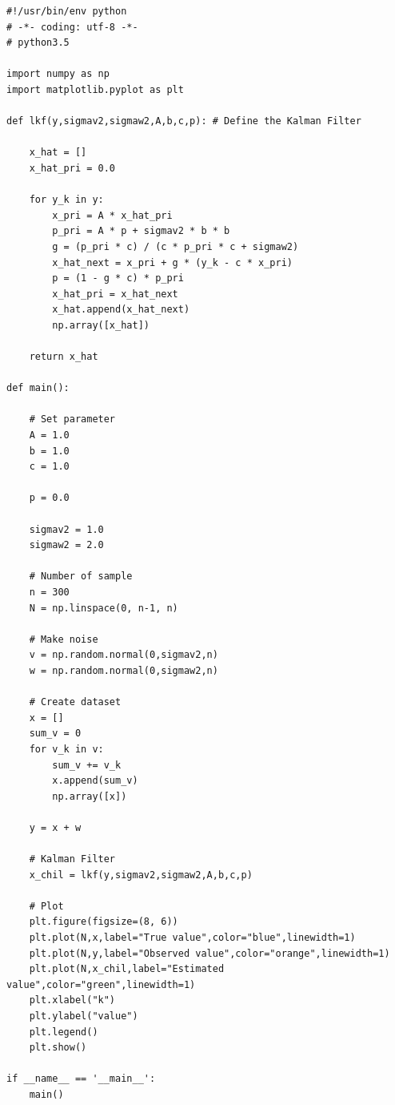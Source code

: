\documentclass[a4paper,11pt]{jarticle}
\begin{document}
\newpage
\begin{lstlisting}[caption=ソースコード]
#!/usr/bin/env python
# -*- coding: utf-8 -*-
# python3.5

import numpy as np
import matplotlib.pyplot as plt

def lkf(y,sigmav2,sigmaw2,A,b,c,p): # Define the Kalman Filter

    x_hat = []
    x_hat_pri = 0.0

    for y_k in y:
        x_pri = A * x_hat_pri
        p_pri = A * p + sigmav2 * b * b
        g = (p_pri * c) / (c * p_pri * c + sigmaw2)
        x_hat_next = x_pri + g * (y_k - c * x_pri)
        p = (1 - g * c) * p_pri
        x_hat_pri = x_hat_next
        x_hat.append(x_hat_next)
        np.array([x_hat])

    return x_hat

def main():

    # Set parameter
    A = 1.0
    b = 1.0
    c = 1.0

    p = 0.0

    sigmav2 = 1.0
    sigmaw2 = 2.0

    # Number of sample
    n = 300
    N = np.linspace(0, n-1, n)

    # Make noise
    v = np.random.normal(0,sigmav2,n)
    w = np.random.normal(0,sigmaw2,n)

    # Create dataset
    x = []
    sum_v = 0
    for v_k in v:
        sum_v += v_k
        x.append(sum_v)
        np.array([x])

    y = x + w

    # Kalman Filter
    x_chil = lkf(y,sigmav2,sigmaw2,A,b,c,p)

    # Plot
    plt.figure(figsize=(8, 6))
    plt.plot(N,x,label="True value",color="blue",linewidth=1)
    plt.plot(N,y,label="Observed value",color="orange",linewidth=1)
    plt.plot(N,x_chil,label="Estimated value",color="green",linewidth=1)
    plt.xlabel("k")
    plt.ylabel("value")
    plt.legend()
    plt.show()

if __name__ == '__main__':
    main()
\end{lstlisting}



\end{document}
